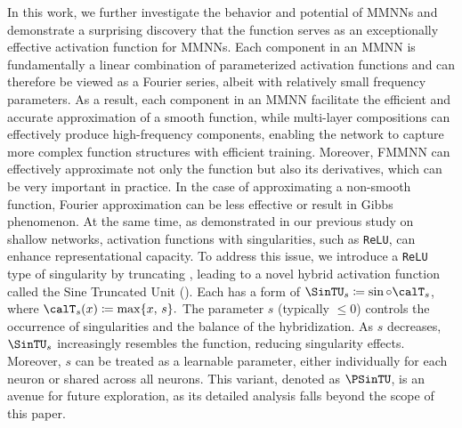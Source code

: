 \documentclass[11pt,a4paper]{article}
\begin{document}
In this work, we further investigate the behavior and potential of MMNNs and demonstrate a surprising discovery that the \sine{} function serves as an exceptionally effective activation function for MMNNs. 
Each component in an MMNN is fundamentally a linear combination of parameterized \sine{} activation functions and can therefore be viewed as a Fourier series, albeit with relatively small frequency parameters. As a result, each component in an MMNN facilitate the efficient and accurate approximation of a smooth function, while multi-layer compositions can effectively produce high-frequency components, enabling the network to capture more complex function structures with efficient training. Moreover, FMMNN can effectively approximate not only the function but also its derivatives, which can be very important in practice.
In the case of approximating a non-smooth function, Fourier approximation can be less effective or result in Gibbs phenomenon. At the same time, as demonstrated in our previous study \cite{ZZZZ-23} on shallow networks, activation functions with singularities, such as \texttt{ReLU}, can enhance representational capacity. 
To address this issue, we introduce a \texttt{ReLU} type of singularity by truncating \sine{}, leading to a novel hybrid activation function called the Sine Truncated Unit (\SinTU). Each \SinTU{} has a form of 
$\SinTU_s\coloneqq \sin\circ \calT_s$, where
\(\calT_s(x) \coloneqq \max\{x,\, s\}.\)
The parameter \( s \) (typically \( \leq 0 \)) controls the occurrence of singularities and the balance of the hybridization. As \( s \) decreases, $\SinTU_s$ increasingly resembles the \sine{} function, reducing singularity effects. Moreover, \( s \) can be treated as a learnable parameter, either individually for each neuron or shared across all neurons. This variant, denoted as \(\PSinTU\), is an avenue for future exploration, as its detailed analysis falls beyond the scope of this paper.
\end{document}
